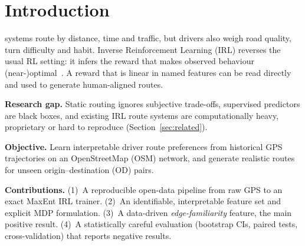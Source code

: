\documentclass{ieeeaccess}
\begin{document}
\section{Introduction}
 systems route by distance, time and traffic, but drivers also weigh road quality, turn difficulty and habit. Inverse Reinforcement Learning (IRL) reverses the usual RL setting: it infers the reward that makes observed behaviour (near-)optimal~\cite{ziebart2008maxent}. A reward that is linear in named features can be read directly and used to generate human-aligned routes.

\textbf{Research gap.} Static routing ignores subjective trade-offs, supervised predictors are black boxes, and existing IRL route systems are computationally heavy, proprietary or hard to reproduce (Section~\ref{sec:related}).

\textbf{Objective.} Learn interpretable driver route preferences from historical GPS trajectories on an OpenStreetMap (OSM) network, and generate realistic routes for unseen origin--destination (OD) pairs.

\textbf{Contributions.}
(1)~A reproducible open-data pipeline from raw GPS to an exact MaxEnt IRL trainer.
(2)~An identifiable, interpretable feature set and explicit MDP formulation.
(3)~A data-driven \emph{edge-familiarity} feature, the main positive result.
(4)~A statistically careful evaluation (bootstrap CIs, paired tests, cross-validation) that reports negative results.

\end{document}
